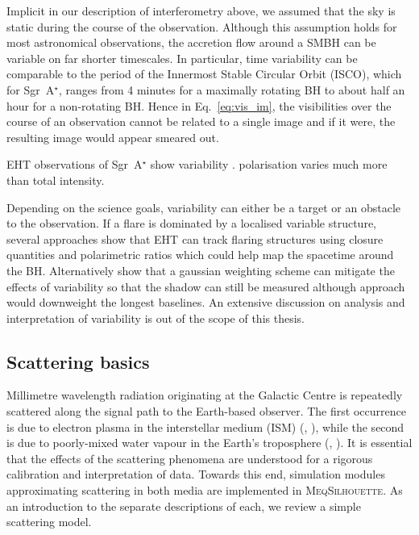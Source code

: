 Implicit in our description of interferometry above, we assumed that the sky is static during the course of the observation. Although this assumption holds for most astronomical observations, the accretion flow around a SMBH can be variable on far shorter timescales. In particular, time variability can be comparable to the period of the Innermost Stable Circular Orbit (ISCO), which for Sgr~A$^\star$, ranges from 4 minutes for a maximally rotating BH to about half an hour for a non-rotating BH. Hence in Eq.~\ref{eq:vis_im}, the visibilities over the course of an observation cannot be related to a single image and if it were, the resulting image would appear smeared out.

EHT observations of Sgr~A$^\star$ show variability \cite{Fish_2009}. polarisation varies much more than total intensity. 

Depending on the science goals, variability can either be a target or an obstacle to the observation. If a flare is dominated by a localised variable structure, several approaches \citep{Doeleman_2009, Johnson_2014} show that EHT can track flaring structures using closure quantities and polarimetric ratios which could help map the spacetime around the BH. Alternatively \citet{Lu_2016} show that a gaussian weighting scheme can  mitigate the effects of variability so that the shadow can still be measured although approach would downweight the longest baselines. An extensive discussion on analysis and interpretation of variability is out of the scope of this thesis.


\subsection{Scattering basics}

Millimetre wavelength radiation originating at the Galactic Centre is repeatedly scattered along the signal path to the Earth-based observer. The first occurrence is due to electron plasma in the interstellar medium (ISM) (\citealt{Bower_2006}, \citealt{Gwinn_2014}), while the second is due to poorly-mixed water vapour in the Earth's troposphere (\citealt*{Carilli_1999}, \citealt*{Lay_1997}). It is essential that the effects of the scattering phenomena are understood for a rigorous calibration and interpretation of data.  Towards this end, simulation modules approximating scattering in both media are implemented in \textsc{MeqSilhouette}. As an introduction to the separate descriptions of each, we review a simple scattering model.


